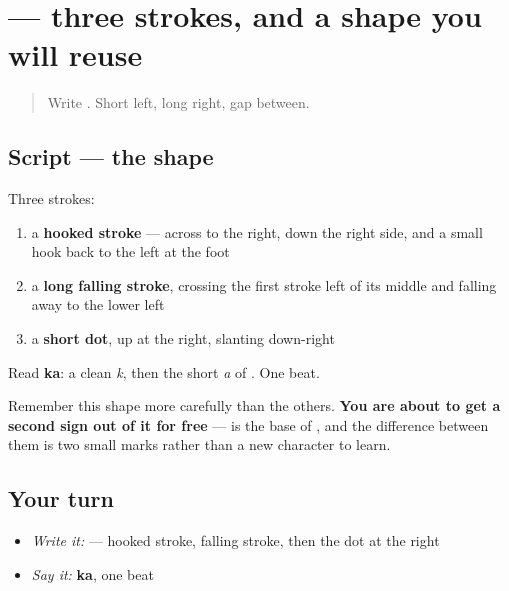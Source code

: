 \section[\texorpdfstring{\ja{か} (ka)}{か (ka)}]{ — three strokes, and a shape you will reuse}

\label{lesson:JA-W03-ka}



\begin{quote}
Write . Short left, long right, gap between.
\end{quote}

\subsection*{Script — the shape}

\begin{quote}
\end{quote}

Three strokes:

\begin{enumerate}
\raggedright
  \item a \textbf{hooked stroke} — across to the right, down the right side, and a small hook back to the left at the foot
  \item a \textbf{long falling stroke}, crossing the first stroke left of its middle and falling away to the lower left
  \item a \textbf{short dot}, up at the right, slanting down-right
\end{enumerate}

Read \textbf{ka}: a clean \emph{k}, then the short \emph{a} of . One beat.

Remember this shape more carefully than the others. \textbf{You are about to get a second sign out of it for free} —  is the base of , and the difference between them is two small marks rather than a new character to learn.

\subsection*{Your turn}
\begin{itemize}
\raggedright
  \item \emph{Write it:}  — hooked stroke, falling stroke, then the dot at the right
  \item \emph{Say it:} \textbf{ka}, one beat
\end{itemize}

